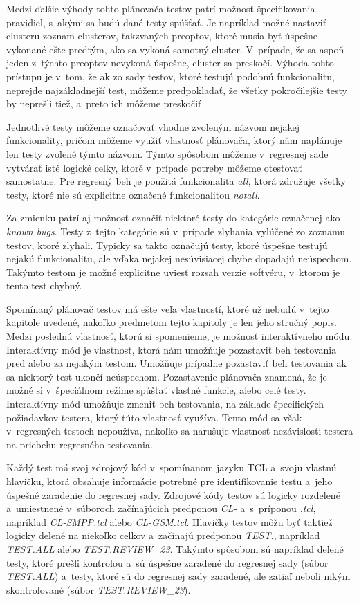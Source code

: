 Medzi ďalšie výhody tohto plánovača testov patrí možnosť špecifikovania pravidiel, s~akými sa budú dané testy spúšťať.
Je napríklad možné nastaviť clusteru zoznam clusterov, takzvaných preoptov, ktoré musia byť úspešne vykonané ešte predtým, ako sa vykoná samotný
cluster. V~prípade, že sa aspoň jeden z~týchto preoptov nevykoná úspešne, cluster sa preskočí.
Výhoda tohto prístupu je v~tom, že ak zo sady testov, ktoré testujú podobnú funkcionalitu, neprejde najzákladnejší test,
môžeme predpokladať, že všetky pokročilejšie testy by neprešli tiež, a~preto ich môžeme preskočiť.

Jednotlivé testy môžeme označovať vhodne zvoleným názvom nejakej funkcionality, pričom môžeme využiť vlastnosť 
plánovača, ktorý nám naplánuje len testy zvolené týmto názvom. Týmto spôsobom môžeme v~regresnej sade vytvárať isté logické celky,
ktoré v~prípade potreby môžeme otestovať samostatne. Pre regresný beh je použitá funkcionalita {\it all}, ktorá združuje 
všetky testy, ktoré nie sú explicitne označené funkcionalitou {\it notall}. 

Za zmienku patrí aj možnosť označiť niektoré testy do kategórie označenej ako {\it known bugs}.
Testy z~tejto kategórie sú v~prípade zlyhania vylúčené zo zoznamu testov, ktoré zlyhali.
Typicky sa takto označujú testy, ktoré úspešne testujú nejakú funkcionalitu, ale vďaka nejakej nesúvisiacej chybe 
dopadajú neúspechom. Takýmto testom je možné explicitne uviesť rozsah verzie softvéru, v~ktorom je tento test chybný.

Spomínaný plánovač testov má ešte veľa vlastností, ktoré už nebudú v~tejto kapitole uvedené, nakoľko predmetom tejto
kapitoly je len jeho stručný popis. Medzi poslednú vlastnosť, ktorú si spomenieme, je možnosť interaktívneho módu.
Interaktívny mód je vlastnosť, ktorá nám umožňuje pozastaviť beh testovania pred alebo za nejakým testom.
Umožňuje prípadne pozastaviť beh testovania ak sa niektorý test ukončí neúspechom. Pozastavenie plánovača znamená,
že je možné si v~špeciálnom režime spúštať vlastné funkcie, alebo celé testy.
Interaktívny mód umožňuje zmeniť beh testovania, na základe špecifických požiadavkov testera, ktorý túto vlastnosť využíva.
Tento mód sa však v~regresných testoch nepoužíva, nakoľko sa narušuje vlastnosť nezávislosti testera na priebehu regresného testovania.

Každý test má svoj zdrojový kód v~spomínanom jazyku TCL a~svoju vlastnú hlavičku, ktorá obsahuje informácie potrebné pre identifikovanie testu a~jeho úspešné zaradenie do regresnej sady.
Zdrojové kódy testov sú logicky rozdelené a~umiestnené v~súboroch začínajúcich predponou {\it CL-} a~s~príponou {\it .tcl}, napríklad {\it CL-SMPP.tcl} alebo {\it CL-GSM.tcl}.
Hlavičky testov môžu byť taktiež logicky delené na niekoľko celkov a~začínajú predponou {\it TEST.}, napríklad {\it TEST.ALL} alebo {\it TEST.REVIEW\_23}.
Takýmto spôsobom sú napríklad delené testy, ktoré prešli kontrolou a~sú úspešne zaradené do regresnej sady (súbor {\it TEST.ALL}) a~testy, ktoré sú do regresnej sady zaradené, ale
zatiaľ neboli nikým skontrolované (súbor {\it TEST.REVIEW\_23}).

